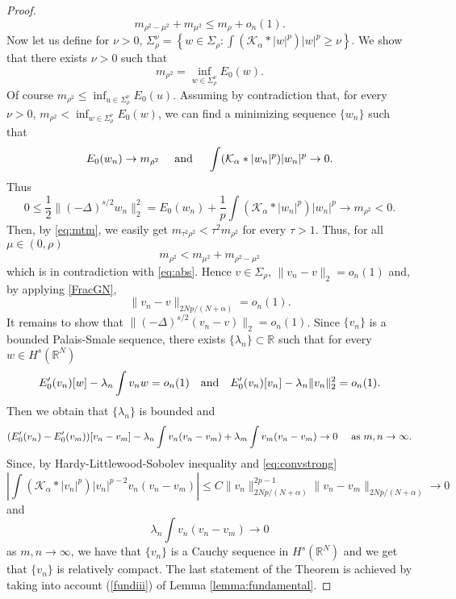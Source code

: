 \documentclass[10pt]{amsart}
\numberwithin{equation}{section}
\begin{document}
\begin{proof}
\begin{equation}
\label{eq:abs}
m_{\rho^2 - \mu^2} + m_{\mu^2} \leq m_{\rho} + o_n (1).
\end{equation}
Now let us define for $\nu>0$, 
$\Sigma_{\rho}^{\nu}=\left\{w\in\Sigma_{\rho} : \int(\mathcal{K}_\alpha * |w|^p)|w|^p \geq \nu \right\}$. We show that
 there exists $\nu>0$ such that
\begin{equation}
\label{eq:mtm}
m_{\rho^2}=\inf_{w\in\Sigma_\rho^{\nu}} E_0(w).
\end{equation}
Of course 
$m_{\rho^2}
\leq \inf_{u\in\Sigma_\rho^{\nu}} E_0(u)$.
Assuming by contradiction that, for every $\nu>0$,
$m_{\rho^2}
< \inf_{w\in\Sigma_\rho^{\nu}}E_0(w)$,
we can find a minimizing sequence $\{w_n\}$ such that 
\[
E_0(w_n)\to m_{\rho^2} 
\quad
\hbox{ and }
\quad
\int(\mathcal{K}_\alpha * |w_n|^p)|w_n|^p\to 0.
\]
Thus
\[
0
\leq \frac{1}{2} \|(-\Delta)^{s/2} w_n\|_2^2 
= E_0(w_n) + \frac{1}{p}\int(\mathcal{K}_\alpha * |w_n|^p)|w_n|^p
\to m_{\rho^2} < 0.
\]
Then, by  \eqref{eq:mtm}, we easily get $m_{\tau^2 \rho^2} < \tau^2 m_{\rho^2}$ for every $\tau>1$.
Thus, for all $\mu\in(0,\rho)$
\begin{equation*}
m_{\rho^2} < m_{\mu^2} + m_{\rho^2 - \mu^2}
\end{equation*}
which is in contradiction with \eqref{eq:abs}. Hence $v \in \Sigma_\rho$, $\| v_n - v \|_2 = o_n(1)$ and, by applying \eqref{FracGN}, 
\begin{equation}
\label{eq:convstrong}
\| v_n - v \|_{2Np/(N+\alpha)} =  o_n(1).
\end{equation}
It remains to show that $\| (-\Delta)^{s/2} (v_n - v) \|_2 = o_n(1)$. Since $\{v_n\}$ is a bounded Palais-Smale sequence, there exists $\{ \lambda_n \} \subset \mathbb{R}$ such that for every $w\in H^s(\mathbb{R}^N)$
\[
E'_0(v_n)[w] -\lambda_n \int v_n w = o_n(1) 
\quad
\hbox{and}
\quad
E'_0(v_n)[v_n] -\lambda_n \| v_n \|_2^2 = o_n(1). 
\]
Then 
we obtain that $\{ \lambda_n \}$ is bounded and
\[
(E'_0(v_n)- E'_0(v_m))[v_n-v_m]
-\lambda_n \int v_n (v_n-v_m) + \lambda_m \int v_m (v_n - v_m)\to 0
\quad \hbox{ as }
m,n\to \infty.
\]
Since, by Hardy-Littlewood-Sobolev inequality and \eqref{eq:convstrong}
\[
\left|
\int(\mathcal{K}_\alpha * |v_n|^p)|v_n|^{p-2} v_n (v_n - v_m)
\right|
\leq
C \|v_n\|_{2Np/(N+\alpha)}^{2p-1} \| v_n -v_m\|_{2Np/(N+\alpha)} \to 0
\]
and
\[
\lambda_n \int v_n ( v_n - v_m) \to 0
\]
as $m,n\to \infty$, we have that $\{ v_n\}$ is a Cauchy sequence in $H^s(\mathbb{R}^N)$ and we get that $\{v_n\}$ is relatively compact. The last statement of the Theorem is achieved by taking into account (\ref{fundiii}) of Lemma \ref{lemma:fundamental}.
\end{proof}
\end{document}
